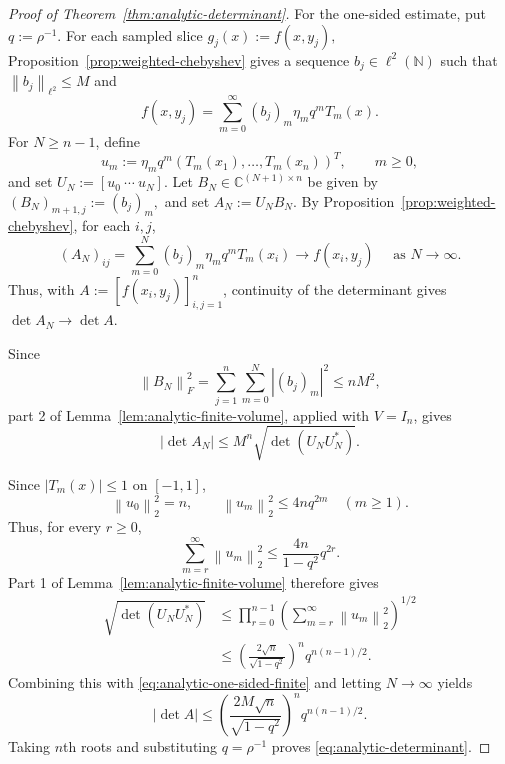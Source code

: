 \documentclass[11pt]{article}
\theoremstyle{definition}
\theoremstyle{remark}
\newcommand{\C}{\mathbb{C}}
\newcommand{\norm}[1]{\left\lVert #1\right\rVert}
\newcommand{\abs}[1]{\left\lvert #1\right\rvert}
\begin{document}
\begin{proof}[Proof of Theorem~\ref{thm:analytic-determinant}]
For the one-sided estimate, put $
    q:=\rho^{-1}.
$ For each sampled slice $
    g_j(x):=f(x,y_j),
$ 
Proposition~\ref{prop:weighted-chebyshev} gives a sequence
\(b_j\in\ell^2(\mathbb N)\) such that
$
    \norm{b_j}_{\ell^2}\le M
$
and
\[
    f(x,y_j)
    =
    \sum_{m=0}^\infty
    (b_j)_m\eta_mq^mT_m(x).
\]
For \(N\ge n-1\), define
\[
    u_m
    :=
    \eta_mq^m
    (T_m(x_1),\ldots,T_m(x_n))^T,
    \qquad
    m\ge0,
\]
and set
$
    U_N:=[u_0\ \cdots\ u_N].
$
Let \(B_N\in\C^{(N+1)\times n}\) be given by
$
    (B_N)_{m+1,j}:=(b_j)_m,
$
and set
$
    A_N:=U_NB_N.
$
By Proposition~\ref{prop:weighted-chebyshev}, for each \(i,j\),
\[
   (A_N)_{ij}
    =
    \sum_{m=0}^N
    (b_j)_m\eta_mq^mT_m(x_i)
    \longrightarrow
    f(x_i,y_j) \quad
     \text{ as } N\to\infty.
\]
Thus, with $A:=[f(x_i,y_j)]_{i,j=1}^n$, continuity of the determinant
gives $\det A_N\to\det A$.

Since
\[
    \norm{B_N}_F^2
    =
    \sum_{j=1}^n\sum_{m=0}^N\abs{(b_j)_m}^2
    \le
    nM^2,
\]
part 2 of Lemma~\ref{lem:analytic-finite-volume}, applied with
\(V=I_n\), gives
\begin{equation}
    \abs{\det A_N}
    \le
    M^n\sqrt{\det(U_NU_N^*)}.
    \label{eq:analytic-one-sided-finite}
\end{equation}

Since \(\abs{T_m(x)}\le1\) on \([-1, 1]\),
\[
    \norm{u_0}_2^2=n,
    \qquad
    \norm{u_m}_2^2\le4nq^{2m}
    \quad(m\ge1).
\]
Thus, for every \(r\ge0\),
\[
    \sum_{m=r}^\infty\norm{u_m}_2^2
    \le
    \frac{4n}{1-q^2}q^{2r}.
\]
Part 1 of Lemma~\ref{lem:analytic-finite-volume} therefore gives
\begin{equation}
\begin{aligned}
    \sqrt{\det(U_NU_N^*)}
    &\le
    \prod_{r=0}^{n-1}
    \left(
      \sum_{m=r}^\infty\norm{u_m}_2^2
    \right)^{1/2}\\
    &\le
    \left(
      \frac{2\sqrt n}{\sqrt{1-q^2}}
    \right)^n
    q^{n(n-1)/2}.
\end{aligned}
\label{eq:analytic-one-sided-volume}
\end{equation}
Combining this with \eqref{eq:analytic-one-sided-finite} and letting
\(N\to\infty\) yields
\[
    \abs{\det A}
    \le
    \left(
      \frac{2M\sqrt n}{\sqrt{1-q^2}}
    \right)^n
    q^{n(n-1)/2}.
\]
Taking \(n\)th roots and substituting \(q=\rho^{-1}\) proves
\eqref{eq:analytic-determinant}.


\end{proof}
\end{document}
